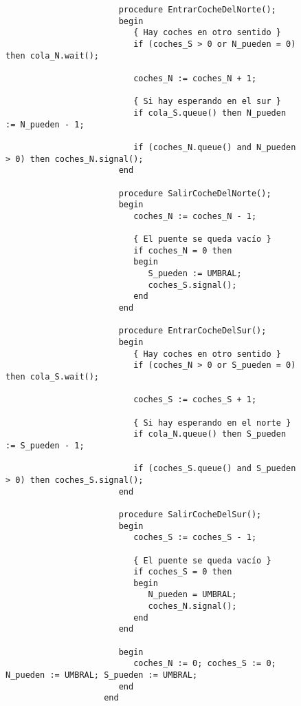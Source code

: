 \begin{ejercicio}
\begin{enumerate}
\begin{figure}[H]
\begin{verbatim}
                       procedure EntrarCocheDelNorte();
                       begin
                          { Hay coches en otro sentido }
                          if (coches_S > 0 or N_pueden = 0) then cola_N.wait();

                          coches_N := coches_N + 1;

                          { Si hay esperando en el sur }
                          if cola_S.queue() then N_pueden := N_pueden - 1;

                          if (coches_N.queue() and N_pueden > 0) then coches_N.signal();
                       end

                       procedure SalirCocheDelNorte();
                       begin
                          coches_N := coches_N - 1;

                          { El puente se queda vacío }
                          if coches_N = 0 then
                          begin
                             S_pueden := UMBRAL;
                             coches_S.signal();
                          end
                       end

                       procedure EntrarCocheDelSur();
                       begin
                          { Hay coches en otro sentido }
                          if (coches_N > 0 or S_pueden = 0) then cola_S.wait();

                          coches_S := coches_S + 1;

                          { Si hay esperando en el norte }
                          if cola_N.queue() then S_pueden := S_pueden - 1;

                          if (coches_S.queue() and S_pueden > 0) then coches_S.signal();
                       end

                       procedure SalirCocheDelSur();
                       begin
                          coches_S := coches_S - 1;

                          { El puente se queda vacío }
                          if coches_S = 0 then
                          begin
                             N_pueden = UMBRAL;
                             coches_N.signal();
                          end
                       end

                       begin
                          coches_N := 0; coches_S := 0; N_pueden := UMBRAL; S_pueden := UMBRAL;
                       end
                    end
                \end{verbatim}
            \end{figure}
    \end{enumerate}
\end{ejercicio}


